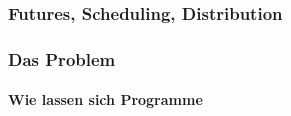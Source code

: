 \documentclass{beamer}
\begin{document}
\begin{frame}

\frametitle{Futures, Scheduling, Distribution}

\end{frame}


\begin{frame}

\frametitle{Das Problem}
\framesubtitle{Wie lassen sich Programme }

\end{frame}
\end{document}
